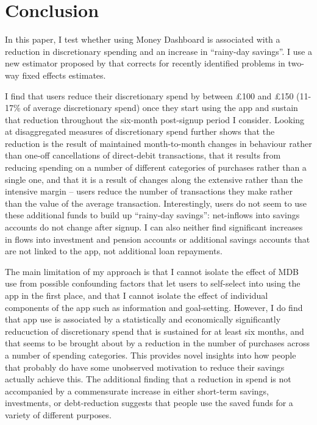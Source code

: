 
\section{Conclusion}
\label{sec:conclusion}

In this paper, I test whether using Money Dashboard is associated
with a reduction in discretionary spending and an increase in ``rainy-day
savings''. I use a new estimator proposed by \citet{callaway2021difference}
that corrects for recently identified problems in two-way fixed effects
estimates.

I find that users reduce their discretionary spend by between \pounds100 and
\pounds150 (11-17\% of average discretionary spend) once they start using the
app and sustain that reduction throughout the six-month post-signup period I
consider. Looking at disaggregated measures of discretionary spend further
shows that the reduction is the result of maintained month-to-month changes in
behaviour rather than one-off cancellations of direct-debit transactions, that
it results from reducing spending on a number of different categories of
purchases rather than a single one, and that it is a result of changes along
the extensive rather than the intensive margin -- users reduce the number of
transactions they make rather than the value of the average transaction.
Interestingly, users do not seem to use these additional funds to build up
``rainy-day savings'': net-inflows into savings accounts do not change after
signup. I can also neither find significant increases in flows into investment
and pension accounts or additional savings accounts that are not linked to the
app, not additional loan repayments.

The main limitation of my approach is that I cannot isolate the effect of MDB
use from possible confounding factors that let users to self-select into using
the app in the first place, and that I cannot isolate the effect of individual
components of the app such as information and goal-setting. However, I do find
that app use is associated by a statistically and economically significantly
reducuction of discretionary spend that is sustained for at least six months,
and that seems to be brought about by a reduction in the number of purchases
across a number of spending categories. This provides novel insights into how
people that probably do have some unobserved motivation to reduce their savings
actually achieve this. The additional finding that a reduction in spend is not
accompanied by a commensurate increase in either short-term savings,
investments, or debt-reduction suggests that people use the saved funds for a
variety of different purposes.

